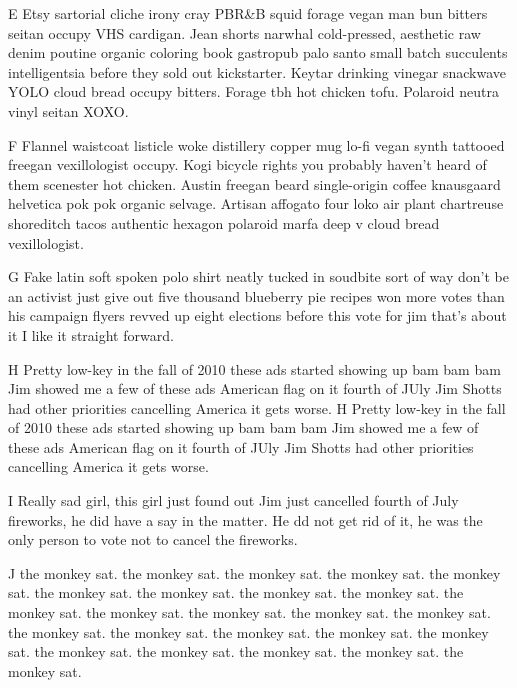 E Etsy sartorial cliche irony cray PBR&B squid forage vegan man bun bitters seitan occupy VHS cardigan. Jean shorts narwhal cold-pressed, aesthetic raw denim poutine organic coloring book gastropub palo santo small batch succulents intelligentsia before they sold out kickstarter. Keytar drinking vinegar snackwave YOLO cloud bread occupy bitters. Forage tbh hot chicken tofu. Polaroid neutra vinyl seitan XOXO.

F Flannel waistcoat listicle woke distillery copper mug lo-fi vegan synth tattooed freegan vexillologist occupy. Kogi bicycle rights you probably haven't heard of them scenester hot chicken. Austin freegan beard single-origin coffee knausgaard helvetica pok pok organic selvage. Artisan affogato four loko air plant chartreuse shoreditch tacos authentic hexagon polaroid marfa deep v cloud bread vexillologist.

G Fake latin soft spoken polo shirt neatly tucked in soudbite sort of way don't be an activist just give out five thousand blueberry pie recipes won more votes than his campaign flyers revved up eight elections before this vote for jim that's about it I like it straight forward.

H Pretty low-key in the fall of 2010 these ads started showing up bam bam bam Jim showed me a few of these ads American flag on it fourth of JUly Jim Shotts had other priorities cancelling America it gets worse. H Pretty low-key in the fall of 2010 these ads started showing up bam bam bam Jim showed me a few of these ads American flag on it fourth of JUly Jim Shotts had other priorities cancelling America it gets worse. 

I Really sad girl, this girl just found out Jim just cancelled fourth of July fireworks, he did have a say in the matter. He dd not get rid of it, he was the only person to vote not to cancel the fireworks.

J the monkey sat. the monkey sat. the monkey sat. the monkey sat. the monkey sat. the monkey sat. the monkey sat. the monkey sat. the monkey sat. the monkey sat. the monkey sat. the monkey sat. the monkey sat. the monkey sat. the monkey sat. the monkey sat. the monkey sat. the monkey sat. the monkey sat. the monkey sat. the monkey sat. the monkey sat. the monkey sat. the monkey sat.

